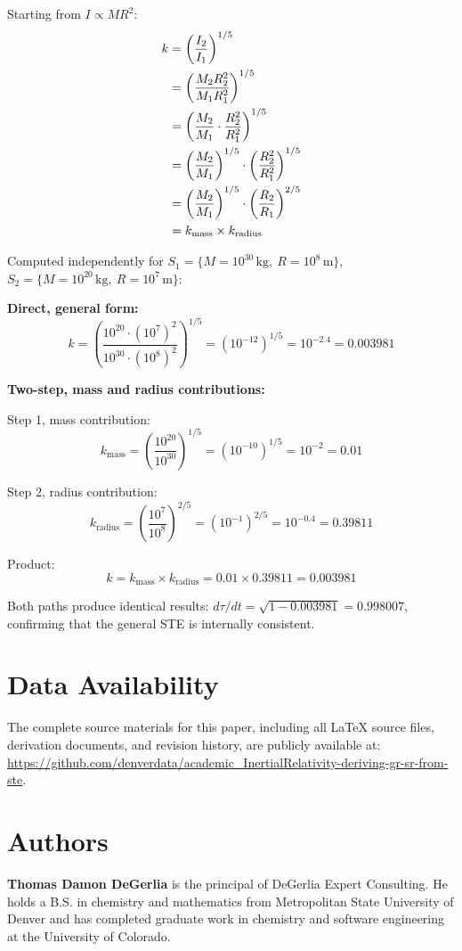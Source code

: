 \documentclass[a4paper,11pt]{article}
\begin{document}
Starting from $I \propto MR^2$:
\begin{align}
k &= \left(\frac{I_2}{I_1}\right)^{1/5} \notag \\
  &= \left(\frac{M_2 R_2^2}{M_1 R_1^2}\right)^{1/5} \notag \\
  &= \left(\frac{M_2}{M_1} \cdot \frac{R_2^2}{R_1^2}\right)^{1/5} \notag \\
  &= \left(\frac{M_2}{M_1}\right)^{1/5} \cdot \left(\frac{R_2^2}{R_1^2}\right)^{1/5} \notag \\
  &= \left(\frac{M_2}{M_1}\right)^{1/5} \cdot \left(\frac{R_2}{R_1}\right)^{2/5} \notag \\
  &= k_{\text{mass}} \times k_{\text{radius}}
\end{align}

Computed independently for $S_1 = \{M=10^{30}\,\text{kg},\ R=10^{8}\,\text{m}\}$, $S_2 = \{M=10^{20}\,\text{kg},\ R=10^{7}\,\text{m}\}$:

\textbf{Direct, general form:}
\[
k = \left(\frac{10^{20} \cdot (10^{7})^2}{10^{30} \cdot (10^{8})^2}\right)^{1/5} = \left(10^{-12}\right)^{1/5} = 10^{-2.4} = 0.003981
\]

\textbf{Two-step, mass and radius contributions:}

Step 1, mass contribution:
\[
k_{\text{mass}} = \left(\frac{10^{20}}{10^{30}}\right)^{1/5} = \left(10^{-10}\right)^{1/5} = 10^{-2} = 0.01
\]

Step 2, radius contribution:
\[
k_{\text{radius}} = \left(\frac{10^{7}}{10^{8}}\right)^{2/5} = \left(10^{-1}\right)^{2/5} = 10^{-0.4} = 0.39811
\]

Product:
\[
k = k_{\text{mass}} \times k_{\text{radius}} = 0.01 \times 0.39811 = 0.003981
\]

Both paths produce identical results: $d\tau/dt = \sqrt{1 - 0.003981} = 0.998007$, confirming that the general STE is internally consistent.

\section*{Data Availability}
The complete source materials for this paper, including all \LaTeX{} source files, derivation documents, and revision history, are publicly available at: \url{https://github.com/denverdata/academic_InertialRelativity-deriving-gr-sr-from-ste}.




\section*{Authors}
\textbf{Thomas Damon DeGerlia} is the principal of DeGerlia Expert Consulting. He holds a B.S. in chemistry and mathematics from Metropolitan State University of Denver and has completed graduate work in chemistry and software engineering at the University of Colorado.
\end{document}

